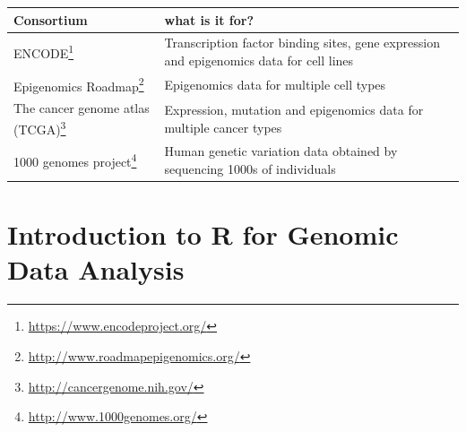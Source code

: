 \documentclass[12pt,]{krantz}
\renewcommand{\href}[2]{#2\footnote{\url{#1}}}
\begin{document}
\begin{longtable}[]{@{}ll@{}}
\toprule
\begin{minipage}[b]{0.32\columnwidth}\raggedright
Consortium\strut
\end{minipage} & \begin{minipage}[b]{0.62\columnwidth}\raggedright
what is it for?\strut
\end{minipage}\tabularnewline
\midrule
\endhead
\begin{minipage}[t]{0.32\columnwidth}\raggedright
\href{https://www.encodeproject.org/}{ENCODE}\strut
\end{minipage} & \begin{minipage}[t]{0.62\columnwidth}\raggedright
Transcription factor binding sites, gene expression and epigenomics data for cell lines\strut
\end{minipage}\tabularnewline
\begin{minipage}[t]{0.32\columnwidth}\raggedright
\href{http://www.roadmapepigenomics.org/}{Epigenomics Roadmap}\strut
\end{minipage} & \begin{minipage}[t]{0.62\columnwidth}\raggedright
Epigenomics data for multiple cell types\strut
\end{minipage}\tabularnewline
\begin{minipage}[t]{0.32\columnwidth}\raggedright
\href{http://cancergenome.nih.gov/}{The cancer genome atlas (TCGA)}\strut
\end{minipage} & \begin{minipage}[t]{0.62\columnwidth}\raggedright
Expression, mutation and epigenomics data for multiple cancer types\strut
\end{minipage}\tabularnewline
\begin{minipage}[t]{0.32\columnwidth}\raggedright
\href{http://www.1000genomes.org/}{1000 genomes project}\strut
\end{minipage} & \begin{minipage}[t]{0.62\columnwidth}\raggedright
Human genetic variation data obtained by sequencing 1000s of individuals\strut
\end{minipage}\tabularnewline
\bottomrule
\end{longtable}

\hypertarget{Rintro}{%
\chapter{Introduction to R for Genomic Data Analysis}\label{Rintro}}
\end{document}
